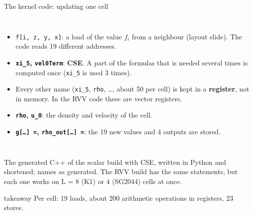 \documentclass[aspectratio=169,10pt,t]{beamer}
\newcommand{\term}[1]{\textcolor{psblue!85!black}{\textbf{#1}}} %
\newcommand{\code}[1]{\texttt{#1}}
\newcommand{\takeaway}[1]{\par\vfill
  \begin{beamercolorbox}[wd=\textwidth,sep=4pt,rounded=true]{takeaway}
    \small #1
  \end{beamercolorbox}}
\begin{document}
\begin{frame}{The kernel code: updating one cell}
  \begin{columns}[T,onlytextwidth]
    \vspace{1mm}
    
    \vspace{1mm}
    \scriptsize
    \begin{itemize}\setlength{\itemsep}{2pt}
      \item \textcolor{psorange!85!black}{\code{f[i, z, y, x]}}: a load of the value $f_i$ from a neighbour (layout
            slide). The code reads 19 different addresses.
      \item \textcolor{psviolet}{\textbf{\code{xi\_5}, \code{vel0Term}}}: \term{CSE}. A part of the formulas that is
            needed several times is computed once (\code{xi\_5} is used 3 times).
      \item Every other name (\code{xi\_5}, \code{rho}, \ldots, about 50 per cell) is kept in a \term{register}, not
            in memory. In the RVV code these are vector registers.
      \item \textcolor{psteal!65!black}{\textbf{\code{rho}, \code{u\_0}}}: the density and velocity of the cell.
      \item \textcolor{psblue!85!black}{\textbf{\code{g[\ldots] =}, \code{rho\_out[\ldots] =}}}: the 19 new values
            and 4 outputs are stored.
    \end{itemize}
  \end{columns}
  \vspace{1mm}
  {\scriptsize\color{psgray}The generated C++ of the scalar build with CSE, written in Python and shortened; names as
  generated. The RVV build
  has the same statements, but each one works on L = 8 (K1) or 4 (SG2044) cells at once.\par}
  \takeaway{Per cell: 19 loads, about 200 arithmetic operations in registers, 23 stores.}
\end{frame}
\end{document}
